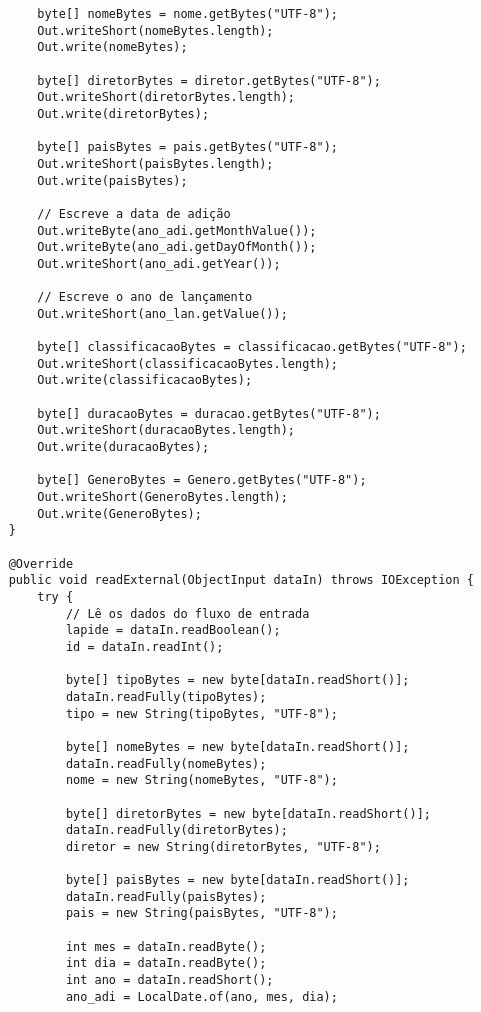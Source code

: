\documentclass[12pt]{article}
\begin{document}
\begin{lstlisting}
        byte[] nomeBytes = nome.getBytes("UTF-8");
        Out.writeShort(nomeBytes.length);
        Out.write(nomeBytes);
        
        byte[] diretorBytes = diretor.getBytes("UTF-8");
        Out.writeShort(diretorBytes.length);
        Out.write(diretorBytes);
        
        byte[] paisBytes = pais.getBytes("UTF-8");
        Out.writeShort(paisBytes.length);
        Out.write(paisBytes);
        
        // Escreve a data de adição
        Out.writeByte(ano_adi.getMonthValue());
        Out.writeByte(ano_adi.getDayOfMonth());
        Out.writeShort(ano_adi.getYear());
        
        // Escreve o ano de lançamento
        Out.writeShort(ano_lan.getValue());
        
        byte[] classificacaoBytes = classificacao.getBytes("UTF-8");
        Out.writeShort(classificacaoBytes.length);
        Out.write(classificacaoBytes);
        
        byte[] duracaoBytes = duracao.getBytes("UTF-8");
        Out.writeShort(duracaoBytes.length);
        Out.write(duracaoBytes);
        
        byte[] GeneroBytes = Genero.getBytes("UTF-8");
        Out.writeShort(GeneroBytes.length);
        Out.write(GeneroBytes);
    }
    
    @Override
    public void readExternal(ObjectInput dataIn) throws IOException {
        try {
            // Lê os dados do fluxo de entrada
            lapide = dataIn.readBoolean();
            id = dataIn.readInt();
            
            byte[] tipoBytes = new byte[dataIn.readShort()];
            dataIn.readFully(tipoBytes);
            tipo = new String(tipoBytes, "UTF-8");
            
            byte[] nomeBytes = new byte[dataIn.readShort()];
            dataIn.readFully(nomeBytes);
            nome = new String(nomeBytes, "UTF-8");
            
            byte[] diretorBytes = new byte[dataIn.readShort()];
            dataIn.readFully(diretorBytes);
            diretor = new String(diretorBytes, "UTF-8");
            
            byte[] paisBytes = new byte[dataIn.readShort()];
            dataIn.readFully(paisBytes);
            pais = new String(paisBytes, "UTF-8");
            
            int mes = dataIn.readByte();
            int dia = dataIn.readByte();
            int ano = dataIn.readShort();
            ano_adi = LocalDate.of(ano, mes, dia);
            

\end{lstlisting}
\end{document}
